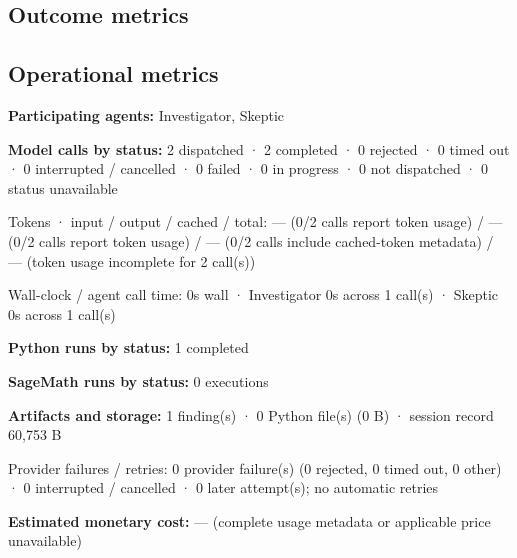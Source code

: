 \documentclass[11pt]{article}
\begin{document}
\subsection{Outcome metrics}
\subsection{Operational metrics}
\textbf{Participating agents:} Investigator, Skeptic\par
\textbf{Model calls by status:} 2 dispatched · 2 completed · 0 rejected · 0 timed out · 0 interrupted / cancelled · 0 failed · 0 in progress · 0 not dispatched · 0 status unavailable\par
Tokens · input / output / cached / total: — (0/2 calls report token usage) / — (0/2 calls report token usage) / — (0/2 calls include cached-token metadata) / — (token usage incomplete for 2 call(s))\par
Wall-clock / agent call time: 0s wall · Investigator 0s across 1 call(s) · Skeptic 0s across 1 call(s)\par
\textbf{Python runs by status:} 1 completed\par
\textbf{SageMath runs by status:} 0 executions\par
\textbf{Artifacts and storage:} 1 finding(s) · 0 Python file(s) (0 B) · session record 60,753 B\par
Provider failures / retries: 0 provider failure(s) (0 rejected, 0 timed out, 0 other) · 0 interrupted / cancelled · 0 later attempt(s); no automatic retries\par
\textbf{Estimated monetary cost:} — (complete usage metadata or applicable price unavailable)\par
\end{document}

